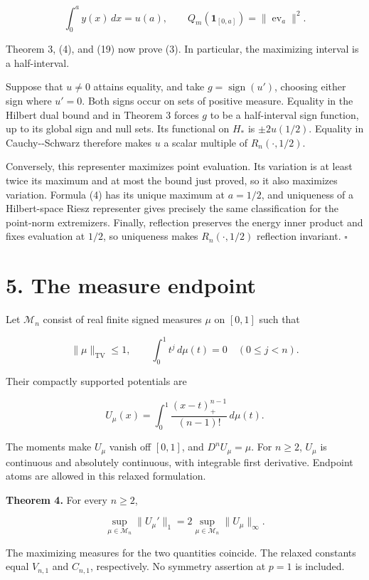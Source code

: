 \documentclass[11pt]{article}
\begin{document}
\[
\int_0^a y(x)\,dx=u(a),
\qquad Q_m(\mathbf1_{[0,a]})=\|\operatorname{ev}_a\|^2.
\tag{20}
\]

Theorem 3, (4), and (19) now prove (3). In particular, the maximizing
interval is a half-interval.

Suppose that \(u\ne0\) attains equality, and take
\(g=\operatorname{sign}(u')\), choosing either sign where \(u'=0\). Both
signs occur on sets of positive measure. Equality in the Hilbert dual
bound and in Theorem 3 forces \(g\) to be a half-interval sign function,
up to its global sign and null sets. Its functional on \(H_*\) is
\(\pm2u(1/2)\). Equality in Cauchy-\/-Schwarz therefore makes \(u\) a
scalar multiple of \(R_n(\cdot,1/2)\).

Conversely, this representer maximizes point evaluation. Its variation
is at least twice its maximum and at most the bound just proved, so it
also maximizes variation. Formula (4) has its unique maximum at
\(a=1/2\), and uniqueness of a Hilbert-space Riesz representer gives
precisely the same classification for the point-norm extremizers.
Finally, reflection preserves the energy inner product and fixes
evaluation at \(1/2\), so uniqueness makes \(R_n(\cdot,1/2)\) reflection
invariant. \(\square\)

\section{5. The measure endpoint}\label{the-measure-endpoint}

Let \(\mathcal M_n\) consist of real finite signed measures \(\mu\) on
\([0,1]\) such that

\[
\|\mu\|_{\mathrm{TV}}\le1,
\qquad \int_0^1t^j\,d\mu(t)=0\quad(0\le j<n).
\tag{21}
\]

Their compactly supported potentials are

\[
U_\mu(x)=\int_0^1\frac{(x-t)_+^{n-1}}{(n-1)!}\,d\mu(t).
\tag{22}
\]

The moments make \(U_\mu\) vanish off \([0,1]\), and \(D^nU_\mu=\mu\).
For \(n\ge2\), \(U_\mu\) is continuous and absolutely continuous, with
integrable first derivative. Endpoint atoms are allowed in this relaxed
formulation.

\textbf{Theorem 4.} For every \(n\ge2\),

\[
\sup_{\mu\in\mathcal M_n}\|U_\mu'\|_1
=2\sup_{\mu\in\mathcal M_n}\|U_\mu\|_\infty.
\tag{23}
\]

The maximizing measures for the two quantities coincide. The relaxed
constants equal \(V_{n,1}\) and \(C_{n,1}\), respectively. No symmetry
assertion at \(p=1\) is included.
\end{document}
